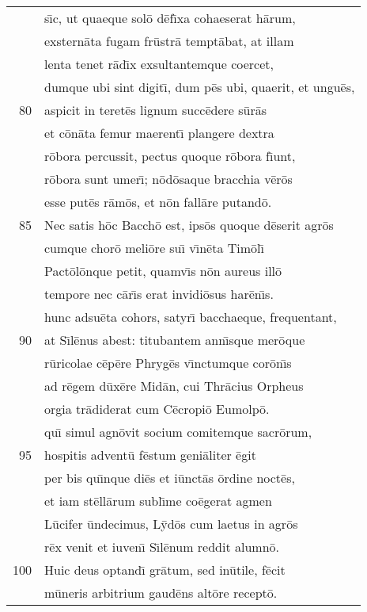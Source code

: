 \documentclass[paper=6in:9in,pagesize=pdftex,
               headinclude=on,footinclude=on,12pt]{scrbook}
\begin{document}
\begin{longtable}[p]{ r l }
 & s\={\i}c, ut quaeque sol\=o d\=ef\={\i}xa cohaeserat h\=arum,\\ 
 & exstern\=ata fugam fr\=ustr\=a tempt\=abat, at illam\\ 
 & lenta tenet r\=ad\={\i}x exsultantemque coercet,\\ 
 & dumque ubi sint digit\={\i}, dum p\=es ubi, quaerit, et ungu\=es,\\ 
80 & aspicit in teret\=es lignum succ\=edere s\=ur\=as\\ 
 & et c\=on\=ata femur maerent\={\i} plangere dextra\\ 
 & r\=obora percussit, pectus quoque r\=obora f\={\i}unt,\\ 
 & r\=obora sunt umer\={\i}; n\=od\=osaque bracchia v\=er\=os\\ 
 & esse put\=es r\=am\=os, et n\=on fall\=are putand\=o.\\ 
85 & \indent Nec satis h\=oc Bacch\=o est, ips\=os quoque d\=eserit agr\=os\\ 
 & cumque chor\=o meli\=ore su\={\i} v\={\i}n\=eta Tim\=ol\={\i}\\ 
 & Pact\=ol\=onque petit, quamv\={\i}s n\=on aureus ill\=o\\ 
 & tempore nec c\=ar\={\i}s erat invidi\=osus har\=en\={\i}s.\\ 
 & hunc adsu\=eta cohors, satyr\={\i} bacchaeque, frequentant,\\ 
90 & at S\={\i}l\=enus abest: titubantem ann\={\i}sque mer\=oque\\ 
 & r\=uricolae c\=ep\=ere Phryg\=es v\={\i}nctumque cor\=on\={\i}s\\ 
 & ad r\=egem d\=ux\=ere Mid\=an, cui Thr\=acius Orpheus\\ 
 & orgia tr\=adiderat cum C\=ecropi\=o Eumolp\=o.\\ 
 & qu\={\i} simul agn\=ovit socium comitemque sacr\=orum,\\ 
95 & hospitis advent\=u f\=estum geni\=aliter \=egit\\ 
 & per bis qu\={\i}nque di\=es et i\=unct\=as \=ordine noct\=es,\\ 
 & et iam st\=ell\=arum subl\={\i}me co\=egerat agmen\\ 
 & L\=ucifer \=undecimus, L\=yd\=os cum laetus in agr\=os\\ 
 & r\=ex venit et iuven\={\i} S\={\i}l\=enum reddit alumn\=o.\\ 
100 & \indent Huic deus optand\={\i} gr\=atum, sed in\=utile, f\=ecit\\ 
 & m\=uneris arbitrium gaud\=ens alt\=ore recept\=o.\\ 

\end{longtable}
\end{document}
